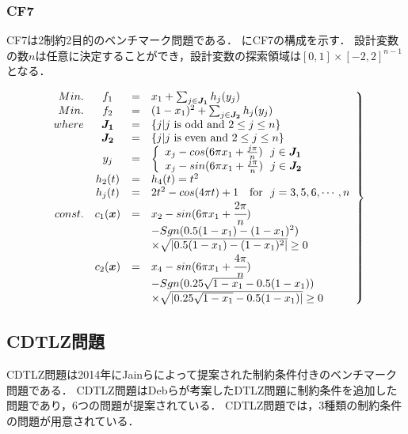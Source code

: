 \documentclass[../main/main]{subfiles}
\begin{document}
\subsubsection{CF7}
CF7は2制約2目的のベンチマーク問題である．
にCF7の構成を示す．
設計変数の数$n$は任意に決定することができ，設計変数の探索領域は$[0,1] \times [-2,2]^{n-1}$となる．

\begin{eqnarray} 
\left.
\begin{array}{rccl}
Min. & f_1 &=& x_1 + \sum_{j \in \bm{J_1}} h_j(y_j)\\
Min. & f_2 &=& (1 - x_1)^2 + \sum_{j \in \bm{J_2}} h_j(y_j)\\
where &  \bm{J_1} &=& \{j|j {\rm \ is \ odd \ and \ } 2 \leq j \leq n\}\\
           & \bm{J_2} &=& \{j|j {\rm \ is \ even \ and \ } 2 \leq j \leq n\}\\
           & y_j &=& \left\{ 
\begin{array}{l}
x_j - cos (6 \pi x_1 + \frac{j\pi}{n}) \ \ j \in \bm{J_1}\\
x_j - sin (6 \pi x_1 + \frac{j\pi}{n}) \ \ j \in \bm{J_2}\\
\end{array}
\right. \\
&h_2(t) &=& h_4(t) = t^2\\
&h_j(t) &=& 2t^2 - cos(4\pi t) + 1 \ \ \ {\rm for \ } \ j = 3,5,6, \cdots, n \\
const. & c_1(\bm x) &=& x_2 - sin(6 \pi x_1 + \cfrac{2\pi}{n}) \\
                        &&&      - Sgn(0.5(1-x_1) - (1-x_1)^2)\\
                        &&& \times \sqrt{|0.5(1-x_1) - (1-x_1)^2|} \geq 0\\
&    c_2(\bm x) & = &x_4 - sin(6\pi x_1 + \cfrac{4\pi}{n}) \\
                    &&& - Sgn(0.25\sqrt{1-x_1} - 0.5(1-x_1))\\
                    &&& \times \sqrt{|0.25 \sqrt{1-x_1} - 0.5(1-x_1)|} \geq 0\\
   \label{cf7_eq} 
\end{array}
\right\}
\end{eqnarray}

\newpage

\subsection{CDTLZ問題}
CDTLZ問題\cite{}は2014年にJainらによって提案された制約条件付きのベンチマーク問題である．
CDTLZ問題はDebらが考案したDTLZ問題に制約条件を追加した問題であり，6つの問題が提案されている．
CDTLZ問題では，3種類の制約条件の問題が用意されている．
\end{document}

